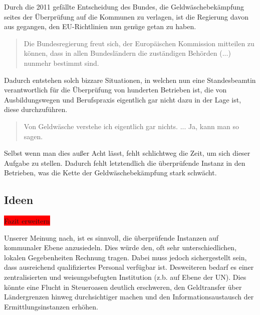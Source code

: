 \documentclass{article}
\begin{document}
            Durch die 2011 gefällte Entscheidung des Bundes, die Geldwäschebekämpfung seites der Überprüfung auf die Kommunen zu verlagen, ist die Regierung davon aus gegangen, den EU-Richtlinien nun genüge getan zu haben.
            \begin{quote} Die Bundesregierung freut sich, der Europäischen Kommission mitteilen zu können, dass in allen Bundesländern die zuständigen Behörden (...) nunmehr bestimmt sind. \cite{EUZeugs} \end{quote}
            Dadurch entstehen solch bizzare Situationen, in welchen nun eine Standesbeamtin verantwortlich für die Überprüfung von hunderten Betrieben ist, die von Ausbildungswegen und Berufspraxis eigentlich gar nicht dazu in der Lage ist, diese durchzuführen. \begin{quote} Von Geldwäsche verstehe ich eigentlich gar nichts. ... Ja, kann man so sagen. \cite{Beatmin} \end{quote} Selbst wenn man dies außer Acht lässt, fehlt schlichtweg die Zeit, um sich dieser Aufgabe zu stellen. Dadurch fehlt letztendlich die überprüfende Instanz in den Betrieben, was die Kette der Geldwäschebekämpfung stark schwächt.

        \subsection[Ideen]{Ideen}
                    \colorbox{red}{Fazit erweitern}

            Unserer Meinung nach, ist es sinnvoll, die überprüfende Instanzen auf kommunaler Ebene anzusiedeln. Dies würde den, oft sehr unterschiedlichen, lokalen Gegebenheiten Rechnung tragen. Dabei muss jedoch sichergestellt sein, dass ausreichend qualifiziertes Personal verfügbar ist.
            Desweiteren bedarf es einer zentralisierten und weisungsbefugten Institution (z.b. auf Ebene der UN). Dies könnte eine Flucht in Steueroasen deutlich erschweren, den Geldtransfer über Ländergrenzen hinweg durchsichtiger machen und den Informationsaustausch der Ermittlungsinstanzen erhöhen.

\newpage
\end{document}
